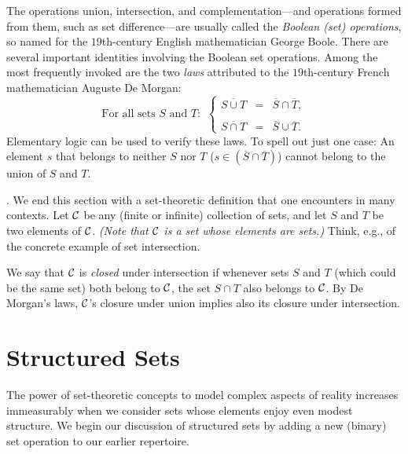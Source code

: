 The operations union, intersection, and complementation---and
operations formed from them, such as set difference---are usually
called the {\em Boolean (set) operations},
 so named for the
$19$th-century English mathematician George Boole.
 There are several important identities involving
the Boolean set operations.  Among the most frequently invoked are the
two {\em laws} attributed to the $19$th-century French mathematician
Auguste De Morgan: 
\begin{equation}
\label{e.de-morgan}
\mbox{For all sets $S$ and $T$: } \ \left\{
\begin{array}{lcl}
\overline{S \cup T} & = & \overline{S} \cap \overline{T}, \\
 \\
\overline{S \cap T} & = & \overline{S} \cup \overline{T}.
\end{array}
\right.
\end{equation}
Elementary logic can be used to verify these laws.  To spell out just
one case: An element $s$ that belongs to neither $S$ nor $T$ ($s \in
\left(\overline{S} \cap \overline{T}\right)$) cannot belong to the
union of $S$ and $T$.

\medskip

.
%
We end this section with a set-theoretic definition that one
encounters in many contexts.  Let $\cal C$ be any (finite or infinite)
collection of sets, and let $S$ and $T$ be two elements of $\cal C$.
{\em (Note that $\cal C$ is a set whose elements are sets.)}  Think,
e.g., of the concrete example of set intersection.

We say that $\cal C$ is {\em closed} under intersection if whenever
sets $S$ and $T$ (which could be the same set) both belong to $\cal
C$, the set $S \cap T$ also belongs to $\cal C$.  By De Morgan's laws,
$\cal C$'s closure under union implies also its closure under
intersection.

\section{Structured Sets}
\label{sec:structured-set}


The power of set-theoretic concepts to model complex aspects of
reality increases immeasurably when we consider sets whose elements
enjoy even modest structure.  We begin our discussion of structured
sets by adding a new (binary) set operation to our earlier repertoire.

